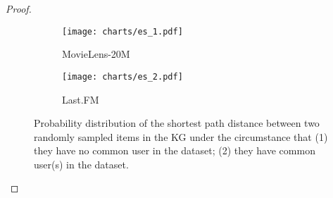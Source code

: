 \documentclass[sigconf]{acmart}
\begin{document}
\begin{proof}
		
		\begin{figure}[t]
		\centering
        \begin{subfigure}[b]{0.22\textwidth}
            \texttt{[image: charts/es\_1.pdf]}
            \caption{MovieLens-20M}
            \label{fig:es_1}
        \end{subfigure}
        \hfill
        \begin{subfigure}[b]{0.22\textwidth}
            \texttt{[image: charts/es\_2.pdf]}
            \caption{Last.FM}
            \label{fig:es_2}
        \end{subfigure}
        \caption{Probability distribution of the shortest path distance between two randomly sampled items in the KG under the circumstance that (1) they have no common user in the dataset; (2) they have common user(s) in the dataset.}
        \label{fig:es}
    	\end{figure}
    	

\end{proof}
\end{document}
